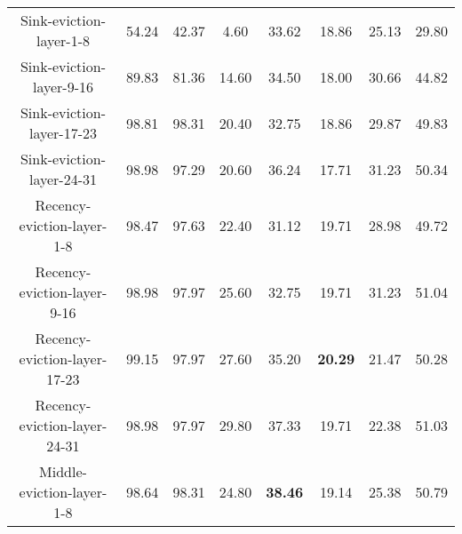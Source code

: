 \begin{table}[H]
{\begin{tabular}{cccccccc}
Sink-eviction-layer-1-8 & 54.24 & 42.37 & 4.60 & 33.62 & 18.86 & 25.13 & 29.80 \\
Sink-eviction-layer-9-16 & 89.83 & 81.36 & 14.60 & 34.50 & 18.00 & 30.66 & 44.82 \\
Sink-eviction-layer-17-23 & 98.81 & 98.31 & 20.40 & 32.75 & 18.86 & 29.87 & 49.83 \\
Sink-eviction-layer-24-31 & 98.98 & 97.29 & 20.60 & 36.24 & 17.71 & 31.23 & 50.34 \\
Recency-eviction-layer-1-8 & 98.47 & 97.63 & 22.40 & 31.12 & 19.71 & 28.98 & 49.72 \\
Recency-eviction-layer-9-16 & 98.98 & 97.97 & 25.60 & 32.75 & 19.71 & 31.23 & 51.04 \\
Recency-eviction-layer-17-23 & 99.15 & 97.97 & 27.60 & 35.20 & \textbf{20.29}  & 21.47 & 50.28 \\
Recency-eviction-layer-24-31 & 98.98 & 97.97 & 29.80 & 37.33 & 19.71 & 22.38 & 51.03 \\
Middle-eviction-layer-1-8 & 98.64 & 98.31 & 24.80 & \textbf{38.46} & 19.14 & 25.38 & 50.79 \\

\end{tabular}}
\end{table}

